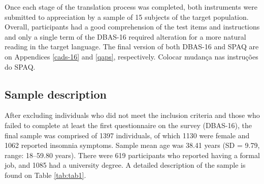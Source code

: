 \documentclass[
  ,doc,11pt, twoside,floatsintext]{apa6}
\begin{document}
Once each stage of the translation process was completed, both instruments were submitted to appreciation by a sample of 15 subjects of the target population. Overall, participants had a good comprehension of the test items and instructions and only a single term of the DBAS-16 required alteration for a more natural reading in the target language. The final version of both DBAS-16 and SPAQ are on Appendices \ref{cads-16} and \ref{qaps}, respectively. Colocar mudança nas instruções do SPAQ.

\hypertarget{sample-description}{%
\subsection{Sample description}\label{sample-description}}

After excluding individuals who did not meet the inclusion criteria and those who failed to complete at least the first questionnaire on the survey (DBAS-16), the final sample was comprised of 1397 individuals, of which 1130 were female and 1062 reported insomnia symptoms. Sample mean age was 38.41 years (SD = 9.79, range: 18--59.80 years). There were 619 participants who reported having a formal job, and 1085 had a university degree. A detailed description of the sample is found on Table \ref{tab:tab1}.
\end{document}
